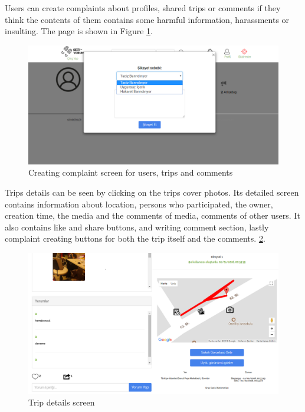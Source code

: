 Users can create complaints about profiles, shared trips or comments if they think the contents of them contains some harmful information, harassments or insulting. The page is shown in Figure \ref{fig:complaintPage}. 

\begin{figure}[!htbp]
\centering
\includegraphics[width=\textwidth]{projectChapters/images/complaintPage.png}
\caption{Creating complaint screen for users, trips and comments}
\label{fig:complaintPage}
\end{figure}

\newpage

Trips details can be seen by clicking on the trips cover photos. Its detailed screen contains information about location, persons who participated, the owner, creation time, the media and the comments of media, comments of other users. It also contains like and share buttons, and writing comment section, lastly complaint creating buttons for both the trip itself and the comments. 
\ref{fig:tripDetail}. 

\begin{figure}[!htbp]
\centering
\includegraphics[scale= 0.4]{projectChapters/images/tripDetail.png}
\caption{Trip details screen}
\label{fig:tripDetail}
\end{figure}

